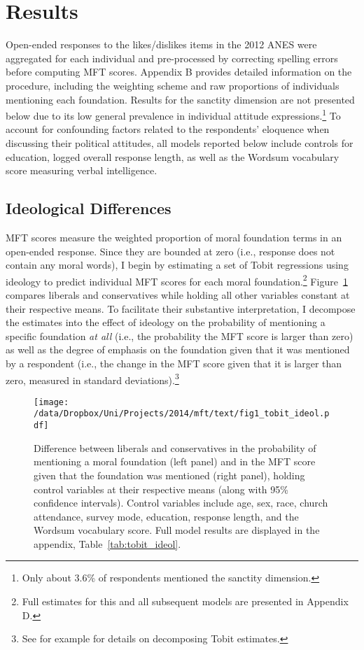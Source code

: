 \section{Results}

Open-ended responses to the likes/dislikes items in the 2012 ANES were aggregated for each individual and pre-processed by correcting spelling errors before computing MFT scores. Appendix B provides detailed information on the procedure, including the weighting scheme and raw proportions of individuals mentioning each foundation. Results for the sanctity dimension are not presented below due to its low general prevalence in individual attitude expressions.\footnote{Only about 3.6\% of respondents mentioned the sanctity dimension.} To account for confounding factors related to the respondents' eloquence when discussing their political attitudes, all models reported below include controls for education, logged overall response length, as well as the Wordsum vocabulary score measuring verbal intelligence.


\subsection{Ideological Differences}

MFT scores measure the weighted proportion of moral foundation terms in an open-ended response. Since they are bounded at zero (i.e., response does not contain any moral words), I begin by estimating a set of Tobit regressions using ideology to predict individual MFT scores for each moral foundation.\footnote{Full estimates for this and all subsequent models are presented in Appendix D.} Figure~\ref{fig:tobit_ideol} compares liberals and conservatives while holding all other variables constant at their respective means. To facilitate their substantive interpretation, I decompose the estimates into the effect of ideology on the probability of mentioning a specific foundation \textit{at all} (i.e., the probability the MFT score is larger than zero) as well as the degree of emphasis on the foundation given that it was mentioned by a respondent (i.e., the change in the MFT score given that it is larger than zero, measured in standard deviations).\footnote{See for example \citet{mcdonald1980uses} for details on decomposing Tobit estimates.}

\begin{figure}[ht]\centering
\texttt{[image: /data/Dropbox/Uni/Projects/2014/mft/text/fig1\_tobit\_ideol.pdf]}
\caption[Difference between liberals and conservatives in moral considerations in open-ended responses]{Difference between liberals and conservatives in the probability of mentioning a moral foundation (left panel) and in the MFT score given that the foundation was mentioned (right panel), holding control variables at their respective means (along with 95\% confidence intervals). Control variables include age, sex, race, church attendance, survey mode, education, response length, and the Wordsum vocabulary score. Full model results are displayed in the appendix, Table~\ref{tab:tobit_ideol}.
}\label{fig:tobit_ideol}
\end{figure}

